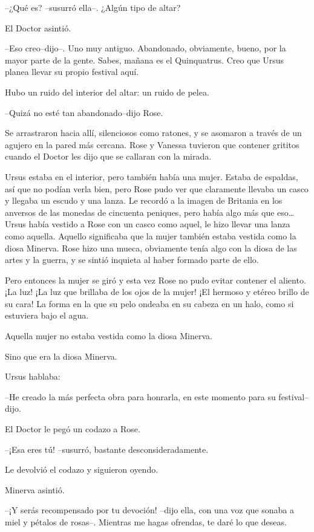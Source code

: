--¿Qué es? --susurró ella--. ¿Algún tipo de altar?

El Doctor asintió.

--Eso creo--dijo--. Uno muy antiguo. Abandonado, obviamente, bueno, por
la mayor parte de la gente. Sabes, mañana es el Quinquatrus. Creo que
Ursus planea llevar su propio festival aquí.

Hubo un ruido del interior del altar: un ruido de pelea.

--Quizá no esté tan abandonado--dijo Rose.

Se arrastraron hacia allí, silenciosos como ratones, y se asomaron a
través de un agujero en la pared más cercana. Rose y Vanessa tuvieron
que contener grititos cuando el Doctor les dijo que se callaran con la
mirada.

Ursus estaba en el interior, pero también había una mujer. Estaba de
espaldas, así que no podían verla bien, pero Rose pudo ver que
claramente llevaba un casco y llegaba un escudo y una lanza. Le recordó
a la imagen de Britania en los anversos de las monedas de cincuenta
peniques, pero había algo más que eso\ldots{} Ursus había vestido a Rose
con un casco como aquel, le hizo llevar una lanza como aquella. Aquello
significaba que la mujer también estaba vestida como la diosa Minerva.
Rose hizo una mueca, obviamente tenía algo con la diosa de las artes y
la guerra, y se sintió inquieta al haber formado parte de ello.

Pero entonces la mujer se giró y esta vez Rose no pudo evitar contener
el aliento. ¡La luz! ¡La luz que brillaba de los ojos de la mujer! ¡El
hermoso y etéreo brillo de su cara! La forma en la que su pelo ondeaba
en su cabeza en un halo, como si estuviera bajo el agua.

Aquella mujer no estaba vestida como la diosa Minerva.

Sino que era la diosa Minerva.

Ursus hablaba:

--He creado la más perfecta obra para honrarla, en este momento para su
festival--dijo.

El Doctor le pegó un codazo a Rose.

--¡Esa eres tú! --susurró, bastante desconsideradamente.

Le devolvió el codazo y siguieron oyendo.

Minerva asintió.

--¡Y serás recompensado por tu devoción! --dijo ella, con una voz que
sonaba a miel y pétalos de rosas--. Mientras me hagas ofrendas, te daré
lo que deseas.

